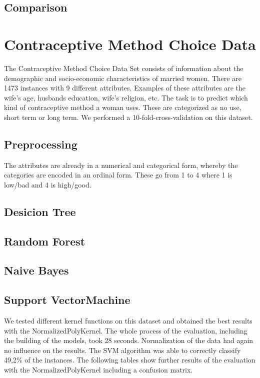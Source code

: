 \documentclass[paper=a4, fontsize=11pt]{scrartcl} %
\numberwithin{equation}{section} %
\numberwithin{figure}{section} %
\numberwithin{table}{section} %
\begin{document}
\subsection{Comparison}

\section{Contraceptive Method Choice Data}

The Contraceptive Method Choice Data Set consists of information about the demographic and socio-economic characteristics of married women. There are 1473 instances with 9 different attributes. Examples of these attributes are the wife's age, husbands education, wife's religion, etc. The task is to predict which kind of contraceptive method a woman uses. These are categorized as no use, short term or long term. We performed a 10-fold-cross-validation on this dataset.

\subsection{Preprocessing}

The attributes are already in a numerical and categorical form, whereby the categories are encoded in an ordinal form. These go from 1 to 4 where 1 is low/bad and 4 is high/good.



\subsection{Desicion Tree}
\subsection{Random Forest}
\subsection{Naive Bayes}
\subsection{Support VectorMachine}

We tested different kernel functions on this dataset and obtained the best results with the NormalizedPolyKernel. The whole process of the evaluation, including the building of the models, took 28 seconds. Normalization of the data had again no influence on the results. The SVM algorithm was able to correctly classify 49,2\% of the instances. The following tables show further results of the evaluation with the NormalizedPolyKernel including a confusion matrix.
\end{document}
